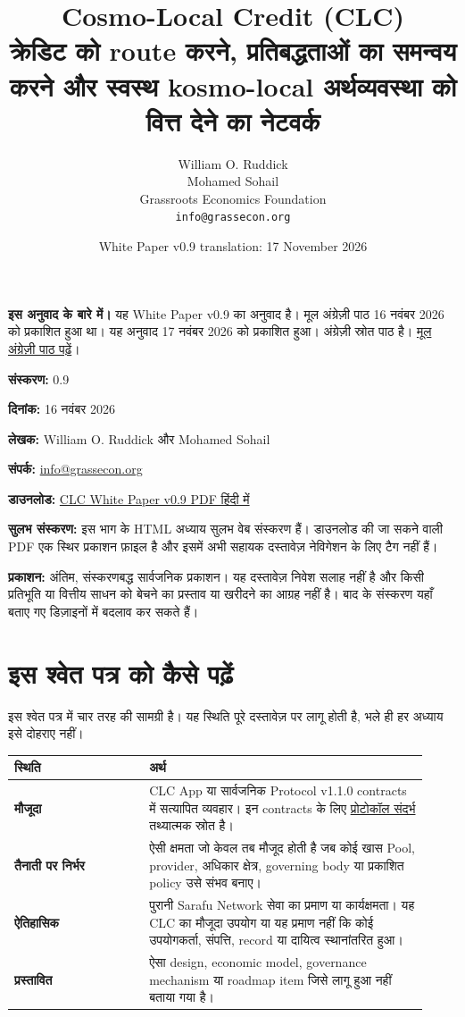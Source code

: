 \documentclass[11pt]{article}
\title{Cosmo-Local Credit (CLC)\\क्रेडिट को route करने, प्रतिबद्धताओं का समन्वय करने और स्वस्थ kosmo-local अर्थव्यवस्था को वित्त देने का नेटवर्क}
\author{William O. Ruddick \\ Mohamed Sohail \\ Grassroots Economics Foundation \\ \texttt{info@grassecon.org}}
\date{White Paper v0.9 translation: 17 November 2026}
\begin{document}
\maketitle
\tableofcontents
\newpage
\sloppy
\RaggedRight

\textbf{इस अनुवाद के बारे में।} यह White Paper v0.9 का अनुवाद है। मूल अंग्रेज़ी पाठ 16 नवंबर 2026 को प्रकाशित हुआ था। यह अनुवाद 17 नवंबर 2026 को प्रकाशित हुआ। अंग्रेज़ी स्रोत पाठ है। \href{https://docs.cosmolocal.credit/white-paper}{मूल अंग्रेज़ी पाठ पढ़ें}।

\textbf{संस्करण:} 0.9

\textbf{दिनांक:} 16 नवंबर 2026

\textbf{लेखक:} William O. Ruddick और Mohamed Sohail

\textbf{संपर्क:} \href{mailto:info@grassecon.org}{info@grassecon.org}

\textbf{डाउनलोड:} \href{https://docs.cosmolocal.credit/white-paper/Cosmo-Local-Credit-CLC-White-Paper-v9-hi.pdf}{CLC White Paper v0.9 PDF हिंदी में}

\textbf{सुलभ संस्करण:} इस भाग के HTML अध्याय सुलभ वेब संस्करण हैं। डाउनलोड की जा सकने वाली PDF एक स्थिर प्रकाशन फ़ाइल है और इसमें अभी सहायक दस्तावेज़ नेविगेशन के लिए टैग नहीं हैं।

\textbf{प्रकाशन:} अंतिम, संस्करणबद्ध सार्वजनिक प्रकाशन। यह दस्तावेज़ निवेश सलाह नहीं है और किसी प्रतिभूति या वित्तीय साधन को बेचने का प्रस्ताव या खरीदने का आग्रह नहीं है। बाद के संस्करण यहाँ बताए गए डिज़ाइनों में बदलाव कर सकते हैं।

\section*{इस श्वेत पत्र को कैसे पढ़ें}

इस श्वेत पत्र में चार तरह की सामग्री है। यह स्थिति पूरे दस्तावेज़ पर लागू होती है, भले ही हर अध्याय इसे दोहराए नहीं।

\begin{longtable}{P{0.30\linewidth} P{0.62\linewidth}}
\toprule
स्थिति & अर्थ \\
\midrule
\endhead
\textbf{मौजूदा} & CLC App या सार्वजनिक Protocol v1.1.0 contracts में सत्यापित व्यवहार। इन contracts के लिए \href{https://docs.cosmolocal.credit/hi/protocol/overview}{प्रोटोकॉल संदर्भ} तथ्यात्मक स्रोत है। \\
\textbf{तैनाती पर निर्भर} & ऐसी क्षमता जो केवल तब मौजूद होती है जब कोई खास Pool, provider, अधिकार क्षेत्र, governing body या प्रकाशित policy उसे संभव बनाए। \\
\textbf{ऐतिहासिक} & पुरानी Sarafu Network सेवा का प्रमाण या कार्यक्षमता। यह CLC का मौजूदा उपयोग या यह प्रमाण नहीं कि कोई उपयोगकर्ता, संपत्ति, record या दायित्व स्थानांतरित हुआ। \\
\textbf{प्रस्तावित} & ऐसा design, economic model, governance mechanism या roadmap item जिसे लागू हुआ नहीं बताया गया है। \\
\bottomrule
\end{longtable}
\end{document}
